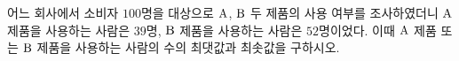 어느 회사에서 소비자 $100$명을 대상으로 $\mathrm{A}$, $\mathrm{B}$ 두 제품의 사용 여부를 조사하였더니 $\mathrm{A}$ 제품을 사용하는 사람은 $39$명, $\mathrm{B}$ 제품을 사용하는 사람은 $52$명이었다. 이때 $\mathrm{A}$ 제품 또는 $\mathrm{B}$ 제품을 사용하는 사람의 수의 최댓값과 최솟값을 구하시오.
